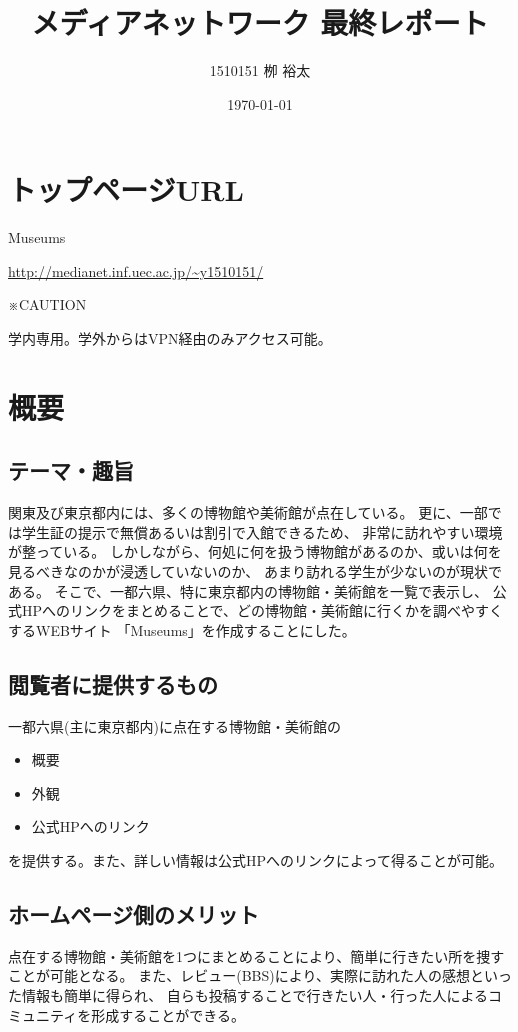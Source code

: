 \documentclass[11pt,a4paper, uplatex]{jsarticle}
\title{メディアネットワーク 最終レポート}
\author{1510151  栁 裕太}
\date{\today}
\begin{document}
\maketitle

\section{トップページURL}
Museums

 \url{http://medianet.inf.uec.ac.jp/~y1510151/}

※CAUTION

学内専用。学外からはVPN経由のみアクセス可能。

\section{概要}
\subsection{テーマ・趣旨}
関東及び東京都内には、多くの博物館や美術館が点在している。
更に、一部では学生証の提示で無償あるいは割引で入館できるため、
非常に訪れやすい環境が整っている。
しかしながら、何処に何を扱う博物館があるのか、或いは何を見るべきなのかが浸透していないのか、
あまり訪れる学生が少ないのが現状である。
そこで、一都六県、特に東京都内の博物館・美術館を一覧で表示し、
公式HPへのリンクをまとめることで、どの博物館・美術館に行くかを調べやすくするWEBサイト
「Museums」を作成することにした。

\subsection{閲覧者に提供するもの\label{info}}
一都六県(主に東京都内)に点在する博物館・美術館の
\begin{itemize}
 \item 概要
 \item 外観
 \item 公式HPへのリンク
\end{itemize}
を提供する。また、詳しい情報は公式HPへのリンクによって得ることが可能。

\subsection{ホームページ側のメリット}
点在する博物館・美術館を1つにまとめることにより、簡単に行きたい所を捜すことが可能となる。
また、レビュー(BBS)により、実際に訪れた人の感想といった情報も簡単に得られ、
自らも投稿することで行きたい人・行った人によるコミュニティを形成することができる。
\end{document}
